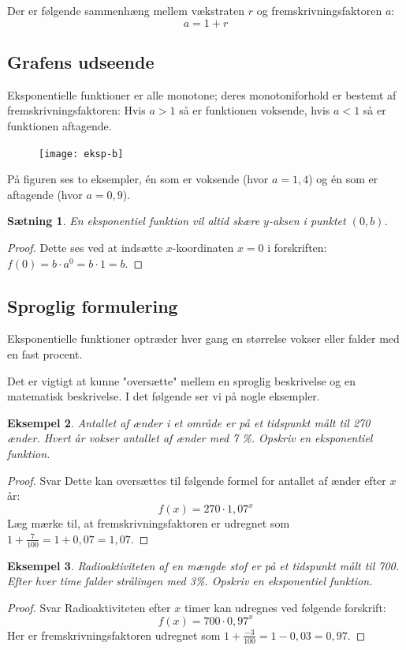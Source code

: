 \documentclass[12pt,oneside,a4paper]{article}
\newtheorem{thm}{Sætning}[section]
\newtheorem{eks}[thm]{Eksempel}
\begin{document}
Der er følgende sammenhæng mellem vækstraten $r$ og fremskrivningsfaktoren $a$:
$$
a = 1 + r
$$

\subsection{Grafens udseende}
Eksponentielle funktioner er alle monotone; deres monotoniforhold er bestemt af
fremskrivningsfaktoren: Hvis $a>1$ så er funktionen voksende, hvis $a<1$ så er
funktionen aftagende.
\begin{figure}[ht]
    \centering
    \texttt{[image: eksp-b]}
    \label{eksp-b}
\end{figure}
På figuren ses to eksempler, én som er voksende (hvor $a=1,4$) og én som er
aftagende (hvor $a=0,9$).

\begin{thm}
    En eksponentiel funktion vil altid skære $y$-aksen i punktet $(0,b)$.
\end{thm}
\begin{proof}
    Dette ses ved at indsætte $x$-koordinaten $x=0$ i forskriften:
    $f(0) = b\cdot a^0 = b\cdot 1 = b$.
\end{proof}

\subsection{Sproglig formulering}
Eksponentielle funktioner optræder hver gang en størrelse vokser eller falder
med en fast procent.

Det er vigtigt at kunne "oversætte" mellem en sproglig beskrivelse og en matematisk beskrivelse.
I det følgende ser vi på nogle eksempler.

\begin{eks}
    Antallet af ænder i et område er på et tidspunkt målt til 270 ænder. Hvert
    år vokser antallet af ænder med 7 \%. Opskriv en eksponentiel funktion.
\end{eks}
\begin{proof}{Svar}
    Dette kan oversættes til følgende formel for antallet af ænder efter $x$ år:
    $$
    f(x) = 270 \cdot 1,07^x
    $$
    Læg mærke til, at fremskrivningsfaktoren er udregnet som $1+\frac{7}{100} =
    1+0,07 = 1,07$.
\end{proof}

\begin{eks}
    Radioaktiviteten af en mængde stof er på et tidspunkt målt til 700. Efter
    hver time falder strålingen med 3\%. Opskriv en eksponentiel funktion.
\end{eks}
\begin{proof}{Svar}
    Radioaktiviteten efter $x$ timer kan udregnes ved følgende forskrift:
    $$
    f(x) = 700 \cdot 0,97^x
    $$
    Her er fremskrivningsfaktoren udregnet som $1 + \frac{-3}{100} = 1-0,03 = 0,97$.
\end{proof}
\end{document}
